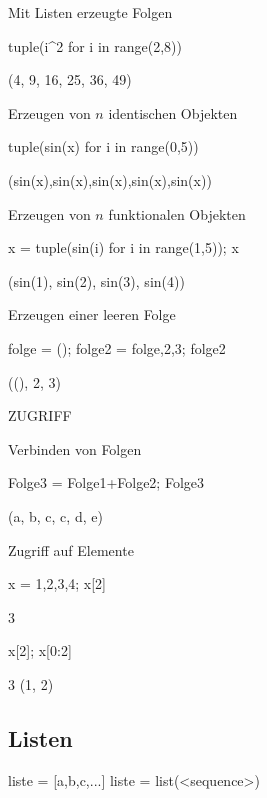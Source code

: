\documentclass[fontsize=12pt,paper=a4,twoside,bibtotoc,idxtotoc,
liststotoc,pagesize,BCOR1.2cm,DIV15,chapterprefix,pagesize=pdftex]{scrbook}
\theoremstyle{plain}
\theoremstyle{definition}
\theoremstyle{remark}
\begin{document}
 Mit Listen erzeugte Folgen 
\begin{sagein}
tuple(i^2 for i in range(2,8))
\end{sagein}
\begin{sage}
(4, 9, 16, 25, 36, 49)
\end{sage}

 Erzeugen von $n$ identischen Objekten
\begin{sagein}
tuple(sin(x) for i in range(0,5))
\end{sagein}
\begin{sage}
  (sin(x),sin(x),sin(x),sin(x),sin(x))
\end{sage}
 Erzeugen von $n$ funktionalen Objekten
\begin{sagein}
x = tuple(sin(i) for i in range(1,5)); x
\end{sagein}
\begin{sage}
(sin(1), sin(2), sin(3), sin(4))
\end{sage}  
 Erzeugen einer leeren Folge
\begin{sagein}
folge = (); folge2 = folge,2,3; folge2
\end{sagein}
\begin{sage}
 ((), 2, 3)
\end{sage}



ZUGRIFF


 Verbinden von Folgen
\begin{sagein}
Folge3 = Folge1+Folge2; Folge3
\end{sagein}
\begin{sage}
(a, b, c, c, d, e)
\end{sage}
 Zugriff auf Elemente
\begin{sagein}
x = 1,2,3,4; x[2] 
\end{sagein}
\begin{sage}
  3
\end{sage}
\begin{sagein}
x[2]; x[0:2]
\end{sagein}
\begin{sage}
3
(1, 2)
\end{sage}



\subsection{Listen}
\begin{sagein}
liste = [a,b,c,...] 
liste = list(<sequence>)
\end{sagein}
\end{document}

